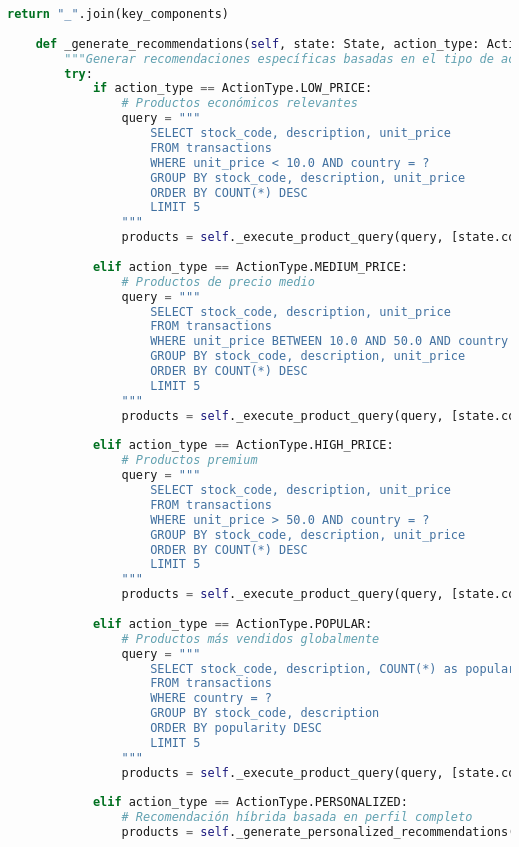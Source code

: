 \begin{lstlisting}[language=python, caption=Implementación Completa del Agente Q-Learning, label=lst:ql_implementation]
        return "_".join(key_components)
    
    def _generate_recommendations(self, state: State, action_type: ActionType) -> List[str]:
        """Generar recomendaciones específicas basadas en el tipo de acción"""
        try:
            if action_type == ActionType.LOW_PRICE:
                # Productos económicos relevantes
                query = """
                    SELECT stock_code, description, unit_price 
                    FROM transactions 
                    WHERE unit_price < 10.0 AND country = ?
                    GROUP BY stock_code, description, unit_price
                    ORDER BY COUNT(*) DESC 
                    LIMIT 5
                """
                products = self._execute_product_query(query, [state.country])
                
            elif action_type == ActionType.MEDIUM_PRICE:
                # Productos de precio medio
                query = """
                    SELECT stock_code, description, unit_price
                    FROM transactions 
                    WHERE unit_price BETWEEN 10.0 AND 50.0 AND country = ?
                    GROUP BY stock_code, description, unit_price
                    ORDER BY COUNT(*) DESC 
                    LIMIT 5
                """
                products = self._execute_product_query(query, [state.country])
                
            elif action_type == ActionType.HIGH_PRICE:
                # Productos premium
                query = """
                    SELECT stock_code, description, unit_price
                    FROM transactions 
                    WHERE unit_price > 50.0 AND country = ?
                    GROUP BY stock_code, description, unit_price
                    ORDER BY COUNT(*) DESC 
                    LIMIT 5
                """
                products = self._execute_product_query(query, [state.country])
                
            elif action_type == ActionType.POPULAR:
                # Productos más vendidos globalmente
                query = """
                    SELECT stock_code, description, COUNT(*) as popularity
                    FROM transactions 
                    WHERE country = ?
                    GROUP BY stock_code, description
                    ORDER BY popularity DESC 
                    LIMIT 5
                """
                products = self._execute_product_query(query, [state.country])
                
            elif action_type == ActionType.PERSONALIZED:
                # Recomendación híbrida basada en perfil completo
                products = self._generate_personalized_recommendations(state)
                

\end{lstlisting}
